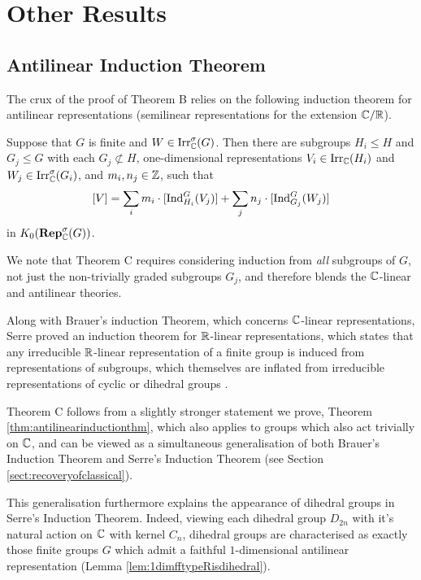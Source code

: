 \section*{Other Results}
\subsection*{Antilinear Induction Theorem}

The crux of the proof of Theorem B relies on the following induction theorem for antilinear representations (semilinear representations for the extension ${\mathbb C} / {\mathbb R}$).

\begin{theoremC}
Suppose that $G$ is finite and $W \in \operatorname{Irr}_{{\mathbb C}}^{\sigma}(G)$. Then there are subgroups $H_i \leq H$ and $G_j \leq G$ with each $G_j \not\subset H$, one-dimensional representations $V_i \in \operatorname{Irr}_{{\mathbb C}}(H_i)$ and $W_j \in \operatorname{Irr}_{{\mathbb C}}^{\sigma}(G_i)$, and $m_i, n_j \in {\mathbb Z}$, such that
\[
    [V] = \sum_i m_i \cdot [\operatorname{Ind}_{H_i}^G(V_j)] + \sum_j n_j \cdot [\operatorname{Ind}_{G_j}^G(W_j)]
\]
in $K_0(\operatorname{\mathbf{Rep}}_{{\mathbb C}}^{\sigma}(G))$.
\end{theoremC}

We note that Theorem C requires considering induction from \emph{all} subgroups of $G$, not just the non-trivially graded subgroups $G_j$, and therefore blends the ${\mathbb C}$-linear and antilinear theories.

Along with Brauer's induction Theorem, which concerns ${\mathbb C}$-linear representations, Serre proved an induction theorem for ${\mathbb R}$-linear representations, which states that any irreducible ${\mathbb R}$-linear representation of a finite group is induced from representations of subgroups, which themselves are inflated from irreducible representations of cyclic or dihedral groups \cite[Lem.\ 73.19]{CR2}.

Theorem C follows from a slightly stronger statement we prove, Theorem \ref{thm:antilinearinductionthm}, which also applies to groups which also act trivially on ${\mathbb C}$, and can be viewed as a simultaneous generalisation of both Brauer's Induction Theorem and Serre's Induction Theorem (see Section \ref{sect:recoveryofclassical}).

This generalisation furthermore explains the appearance of dihedral groups in Serre's Induction Theorem. Indeed, viewing each dihedral group $D_{2n}$ with it's natural action on ${\mathbb C}$ with kernel $C_n$, dihedral groups are characterised as exactly those finite groups $G$ which admit a faithful $1$-dimensional antilinear representation (Lemma \ref{lem:1dimfftypeRisdihedral}).

